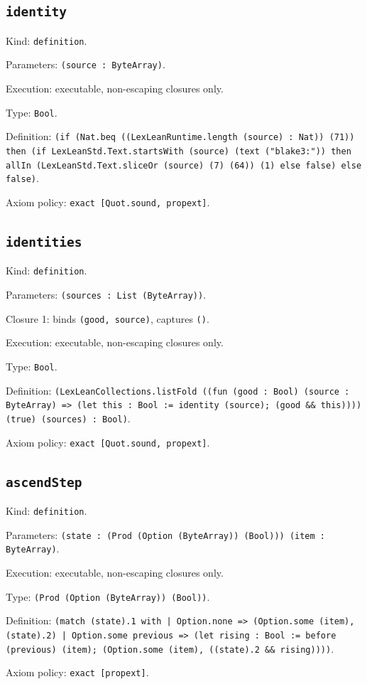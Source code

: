 \documentclass[11pt]{article}
\begin{document}
\subsection*{\texttt{identity}}
\noindent Kind: \texttt{definition}.\par
\noindent Parameters: \texttt{(source : ByteArray)}.\par
\noindent Execution: executable, non-escaping closures only.\par
\noindent Type: \texttt{Bool}.\par
\noindent Definition: \texttt{(if (Nat.beq ((LexLeanRuntime.length (source) : Nat)) (71)) then (if LexLeanStd.Text.startsWith (source) (text ("blake3:")) then allIn (LexLeanStd.Text.sliceOr (source) (7) (64)) (1) else false) else false)}.\par
\noindent Axiom policy: \texttt{exact [Quot.sound, propext]}.\par
\subsection*{\texttt{identities}}
\noindent Kind: \texttt{definition}.\par
\noindent Parameters: \texttt{(sources : List (ByteArray))}.\par
\noindent Closure 1: binds \texttt{(good, source)}, captures \texttt{()}.\par
\noindent Execution: executable, non-escaping closures only.\par
\noindent Type: \texttt{Bool}.\par
\noindent Definition: \texttt{(LexLeanCollections.listFold ((fun (good : Bool) (source : ByteArray) => (let this : Bool := identity (source); (good \&\& this)))) (true) (sources) : Bool)}.\par
\noindent Axiom policy: \texttt{exact [Quot.sound, propext]}.\par
\subsection*{\texttt{ascendStep}}
\noindent Kind: \texttt{definition}.\par
\noindent Parameters: \texttt{(state : (Prod (Option (ByteArray)) (Bool))) (item : ByteArray)}.\par
\noindent Execution: executable, non-escaping closures only.\par
\noindent Type: \texttt{(Prod (Option (ByteArray)) (Bool))}.\par
\noindent Definition: \texttt{(match (state).1 with | Option.none => (Option.some (item), (state).2) | Option.some previous => (let rising : Bool := before (previous) (item); (Option.some (item), ((state).2 \&\& rising))))}.\par
\noindent Axiom policy: \texttt{exact [propext]}.\par
\end{document}
